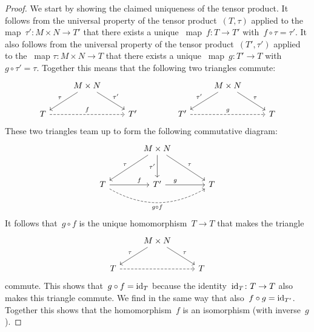 \begin{proof}
  We start by showing the claimed uniqueness of the tensor product.
  It follows from the universal property of the tensor product~$(T,\tau)$ applied to the~{} map~$\tau' \colon M \times N \to T'$ that there exists a unique~{\klin} map~$f \colon T \to T'$ with~$f \circ \tau = \tau'$.
  It also follows from the universal property of the tensor product~$(T',\tau')$ applied to the~{} map $\tau \colon M \times N \to T$ that there exists a unique~{\klin} map~$g \colon T' \to T$ with~$g \circ \tau' = \tau$.
  Together this means that the following two triangles commute:
  \[
    \begin{tikzcd}
        {}
      & M \times N
        \arrow{dl}[above left]{\tau}
        \arrow{dr}[above right]{\tau'}
      & {}
      \\
        T
        \arrow[dashed]{rr}{f}
      & {}
      & T'
    \end{tikzcd}
    \qquad\qquad
    \begin{tikzcd}
        {}
      & M \times N
        \arrow{dl}[above left]{\tau'}
        \arrow{dr}[above right]{\tau}
      & {}
      \\
        T'
        \arrow[dashed]{rr}{g}
      & {}
      & T
    \end{tikzcd}
  \]
  These two triangles team up to form the following commutative diagram:
  \[
    \begin{tikzcd}[sep = large]
        {}
      & M \times N
        \arrow{dl}[above left]{\tau}
        \arrow{d}[left]{\tau'}
        \arrow{dr}[above right]{\tau}
      & {}
      \\
        T
        \arrow{r}[above, near end]{f}
        \arrow[dashed, bend right]{rr}[below]{g \circ f}
      & T'
        \arrow{r}[above, near start]{g}
      & T
    \end{tikzcd}
  \]
  It follows that~$g \circ f$ is the unique homomorphism~$T \to T$ that makes the triangle
  \[
    \begin{tikzcd}
        {}
      & M \times N
        \arrow{dl}[above left]{\tau}
        \arrow{dr}[above right]{\tau}
      & {}
      \\
        T
        \arrow[dashed]{rr}
      & {}
      & T
    \end{tikzcd}
  \]
  commute.
  This shows that~$g \circ f = \operatorname{id}_T$ because the identity~$\operatorname{id}_T \colon T \to T$ also makes this triangle commute.
  We find in the same way that also~$f \circ g = \operatorname{id}_{T'}$.
  Together this shows that the homomorphism~$f$ is an isomorphism (with inverse~$g$).
  

\end{proof}
